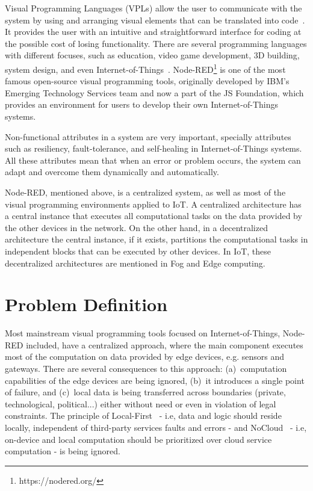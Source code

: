 Visual Programming Languages (VPLs) allow the user to communicate with the system by using and arranging visual elements that can be translated into code~\cite{vpl-book}. It provides the user with an intuitive and straightforward interface for coding at the possible cost of losing functionality. There are several programming languages with different focuses, such as education, video game development, 3D building, system design, and even Internet-of-Things~\cite{survey_vpl_iot}. Node-RED\footnote{https://nodered.org/} is one of the most famous open-source visual programming tools, originally developed by IBM’s Emerging Technology Services team and now a part of the JS Foundation, which provides an environment for users to develop their own Internet-of-Things systems.

Non-functional attributes in a system are very important, specially attributes such as resiliency, fault-tolerance, and self-healing in Internet-of-Things systems. All these attributes mean that when an error or problem occurs, the system can adapt and overcome them dynamically and automatically.

Node-RED, mentioned above, is a centralized system, as well as most of the visual programming environments applied to IoT. A centralized architecture has a central instance that executes all computational tasks on the data provided by the other devices in the network. On the other hand, in a decentralized architecture the central instance, if it exists, partitions the computational tasks in independent blocks that can be executed by other devices. In IoT, these decentralized architectures are mentioned in Fog and Edge computing.

\section{Problem Definition} \label{sec:problem_definition}

Most mainstream visual programming tools focused on Internet-of-Things, Node-RED included, have a centralized approach, where the main component executes most of the computation on data provided by edge devices, e.g. sensors and gateways. There are several consequences to this approach: (a)~computation capabilities of the edge devices are being ignored, (b)~it introduces a single point of failure, and (c)~local data is being transferred across boundaries (private, technological, political...) either without need or even in violation of legal constraints. The principle of Local-First~\cite{localfist} - i.e, data and logic should reside locally, independent of third-party services faults and errors - and NoCloud~\cite{nocloud} - i.e, on-device and local computation should be prioritized over cloud service computation - is being ignored. 

